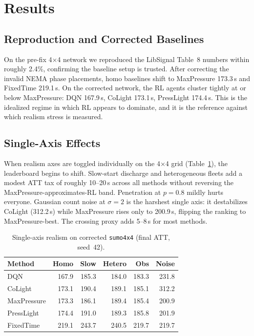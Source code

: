 \documentclass[conference]{IEEEtran}
\begin{document}
\section{Results}

\subsection{Reproduction and Corrected Baselines}

On the pre-fix 4$\times$4 network we reproduced the LibSignal Table~8 numbers within roughly 2.4\%, confirming the baseline setup is trusted. After correcting the invalid NEMA phase placements, homo baselines shift to MaxPressure 173.3\,s and FixedTime 219.1\,s. On the corrected network, the RL agents cluster tightly at or below MaxPressure: DQN 167.9\,s, CoLight 173.1\,s, PressLight 174.4\,s. This is the idealized regime in which RL appears to dominate, and it is the reference against which realism stress is measured.

\subsection{Single-Axis Effects}

When realism axes are toggled individually on the 4$\times$4 grid (Table~\ref{tab:axes4x4}), the leaderboard begins to shift. Slow-start discharge and heterogeneous fleets add a modest ATT tax of roughly 10--20\,s across all methods without reversing the MaxPressure-approximates-RL band. Penetration at $p{=}0.8$ mildly hurts everyone. Gaussian count noise at $\sigma{=}2$ is the harshest single axis: it destabilizes CoLight (312.2\,s) while MaxPressure rises only to 200.9\,s, flipping the ranking to MaxPressure-best. The crossing proxy adds 5--8\,s for most methods.

\begin{table}[t]
\centering
\caption{Single-axis realism on corrected \texttt{sumo4x4} (final ATT, seed~42).}
\label{tab:axes4x4}
\setlength{\tabcolsep}{4pt}
\begin{tabular}{lrrrrr}
\toprule
Method & Homo & Slow & Hetero & Obs & Noise \\
\midrule
DQN         & 167.9 & 185.3 & 184.0 & 183.3 & 231.8 \\
CoLight     & 173.1 & 190.4 & 189.1 & 185.1 & 312.2 \\
MaxPressure & 173.3 & 186.1 & 189.4 & 185.4 & 200.9 \\
PressLight  & 174.4 & 191.0 & 189.3 & 185.8 & 201.9 \\
FixedTime   & 219.1 & 243.7 & 240.5 & 219.7 & 219.7 \\
\bottomrule
\end{tabular}
\end{table}
\end{document}
